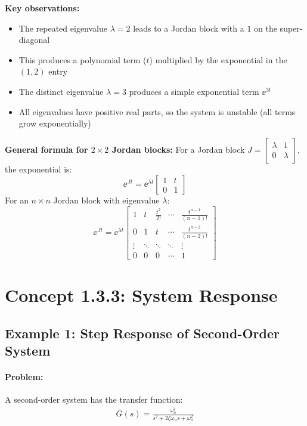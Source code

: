 \documentclass[11pt,a4paper]{article}
\begin{document}
\textbf{Key observations:}
\begin{itemize}
\item The repeated eigenvalue $\lambda = 2$ leads to a Jordan block with a $1$ on the super-diagonal
\item This produces a polynomial term ($t$) multiplied by the exponential in the $(1,2)$ entry
\item The distinct eigenvalue $\lambda = 3$ produces a simple exponential term $\ee^{3t}$
\item All eigenvalues have positive real parts, so the system is unstable (all terms grow exponentially)
\end{itemize}

\textbf{General formula for $2\times 2$ Jordan blocks:}
For a Jordan block $J = \begin{bmatrix} \lambda & 1 \\ 0 & \lambda \end{bmatrix}$, the exponential is:
\[
\ee^{Jt} = \ee^{\lambda t}\begin{bmatrix} 1 & t \\ 0 & 1 \end{bmatrix}
\]
For an $n \times n$ Jordan block with eigenvalue $\lambda$:
\[
\ee^{Jt} = \ee^{\lambda t}\begin{bmatrix} 1 & t & \frac{t^2}{2!} & \cdots & \frac{t^{n-1}}{(n-1)!} \\ 0 & 1 & t & \cdots & \frac{t^{n-2}}{(n-2)!} \\ \vdots & \ddots & \ddots & \ddots & \vdots \\ 0 & 0 & 0 & \cdots & 1 \end{bmatrix}
\]

\section{Concept 1.3.3: System Response}

\subsection{Example 1: Step Response of Second-Order System}

\paragraph{Problem:} A second-order system has the transfer function:
\begin{align}
G(s) = \frac{\omega_n^2}{s^2 + 2\zeta\omega_n s + \omega_n^2}
\end{align}
\end{document}
